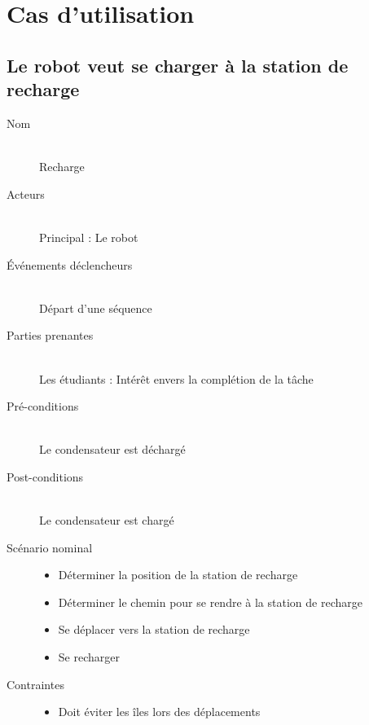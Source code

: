 \chapter{Cas d'utilisation}

\renewcommand{\labelitemi}{$\bullet$}
\renewcommand{\labelitemii}{$\circ$}

\section{Le robot veut se charger à la station de recharge}
\begin{description}
\item[Nom]  \hfill \\
  Recharge
\item[Acteurs] \hfill \\
  Principal : Le robot
\item[Événements déclencheurs] \hfill \\
  Départ d'une séquence
\item[Parties prenantes] \hfill \\
  Les étudiants : Intérêt envers la complétion de
  la tâche
\item[Pré-conditions] \hfill \\
  Le condensateur est déchargé
\item[Post-conditions] \hfill \\
  Le condensateur est chargé
\item[Scénario nominal] \hfill
  \begin{itemize}
  \item Déterminer la position de la station de recharge
  \item Déterminer le chemin pour se rendre à la station de recharge
  \item Se déplacer vers la station de recharge
  \item Se recharger
  \end{itemize}
\item[Contraintes] \hfill
  \begin{itemize}
  \item Doit éviter les îles lors des déplacements
  \end{itemize}
\end{description}

